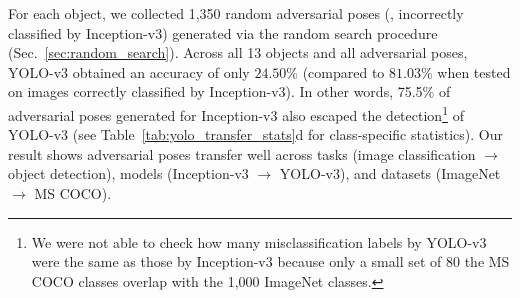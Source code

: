 \documentclass[10pt,twocolumn,letterpaper]{article}
\newcommand{\subsec}[1]{\noindent{\textbf{#1.}}}
\begin{document}
For each object, we collected 1,350 random adversarial poses (\ie, incorrectly classified by Inception-v3) generated via the random search procedure (Sec.~\ref{sec:random_search}).
Across all 13 objects and all adversarial poses, YOLO-v3 obtained an accuracy of only $24.50\%$ (compared to $81.03\%$ when tested on images correctly classified by Inception-v3).
In other words, 75.5\% of adversarial poses generated for Inception-v3 also escaped the detection\footnote{We were not able to check how many misclassification labels by YOLO-v3 were the same as those by Inception-v3 because only a small set of 80 the MS COCO classes overlap with the 1,000 ImageNet classes.} of YOLO-v3 (see Table~\ref{tab:yolo_transfer_stats}d for class-specific statistics).
Our result shows adversarial poses transfer well across tasks (image classification $\to$ object detection), models (Inception-v3 $\to$ YOLO-v3), and datasets (ImageNet $\to$ MS COCO).










\end{document}
